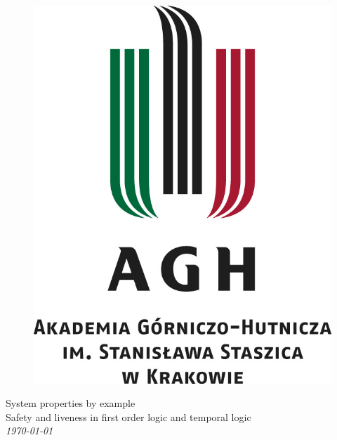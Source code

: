 \documentclass[a4paper,12pt]{article}
\begin{document}
\onehalfspacing
\begin{figure}[!htb]
  \centerline{\includegraphics[scale=0.8]{../images/agh_logo.jpg}}
\end{figure}

\begin{center}
  \Huge{System properties by example\\}
  \Large{Safety and liveness in first order logic and temporal logic\\ \large \textit \today \\}
  \vspace{3cm}

  \newpage
\end{center}

\end{document}
